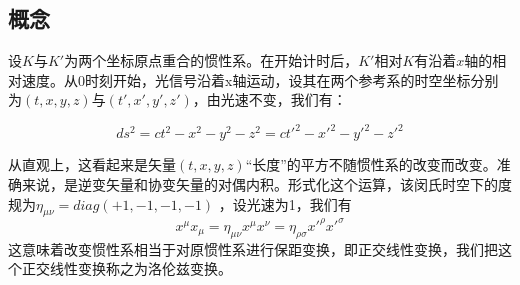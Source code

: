 \subsection{概念}
设$K$与$K'$为两个坐标原点重合的惯性系。在开始计时后，$K'$相对$K$有沿着$x$轴的相对速度。从$0$时刻开始，光信号沿着x轴运动，设其在两个参考系的时空坐标分别为$(t,x,y,z)$与$(t',x',y',z')$，由光速不变，我们有：

$$ds^2=ct^2-x^2-y^2-z^2=ct'^2-x'^2-y'^2-z'^2$$

从直观上，这看起来是矢量$(t,x,y,z)$“长度”的平方不随惯性系的改变而改变。准确来说，是逆变矢量和协变矢量的对偶内积。形式化这个运算，该闵氏时空下的度规为$\eta_{\mu\nu}=diag(+1,-1,-1,-1) $ ，设光速为1，我们有
\begin{equation}
x^\mu x_\mu =\eta_{\mu\nu}x^\mu x^\nu=\eta_{\rho \sigma}x'^\rho x'^\sigma   
\end{equation}
这意味着改变惯性系相当于对原惯性系进行保距变换，即正交线性变换，我们把这个正交线性变换称之为洛伦兹变换。


